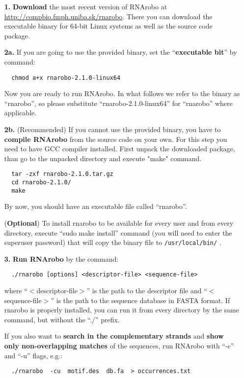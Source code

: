 \documentclass[11pt]{article}
\begin{document}
\begin{enumerate}
\item[\textbf{1.}] \textbf{Download} the most recent version of RNArobo at \url{http://compbio.fmph.uniba.sk/rnarobo}. There you can download the executable binary for 64-bit Linux systems as well as the source code package. 

\item[\textbf{2a.}] If you are going to use the provided binary, set the ``\textbf{executable bit}'' by command:
\begin{verbatim}
  chmod a+x rnarobo-2.1.0-linux64
\end{verbatim}
Now you are ready to run RNArobo. In what follows we refer to the binary as ``rnarobo'', so please substitute ``rnarobo-2.1.0-linux64'' for ``rnarobo'' where applicable.

\item[\textbf{2b.}] (Recommended) If you cannot use the provided binary, you have to \textbf{compile RNArobo} from the source code on your own. For this step you need to have GCC compiler installed. First unpack the downloaded package, than go to the unpacked directory and execute "make" command.
\begin{verbatim}
  tar -zxf rnarobo-2.1.0.tar.gz 
  cd rnarobo-2.1.0/
  make
\end{verbatim}

By now, you should have an executable file called ``rnarobo''. 

(\textbf{Optional}) To install rnarobo to be available for every user and from every directory, execute ``sudo make install'' command (you will need to enter the superuser password) that will copy the binary file to \texttt{/usr/local/bin/} .

\item[\textbf{3.}] \textbf{Run RNArobo} by the command:
\begin{verbatim}
  ./rnarobo [options] <descriptor-file> <sequence-file>
\end{verbatim}

where ``$<$descriptor-file$>$'' is the path to the descriptor file and ``$<$sequence-file$>$'' is the path to the sequence database in FASTA format. If rnarobo is properly installed, you can run it from every directory by the same command, but without the ``./'' prefix.

If you also want to \textbf{search in the complementary strands} and \textbf{show only non-overlapping matches} of the sequences, run RNArobo with ``-c'' and ``-u'' flags, e.g.: 
\begin{verbatim}
  ./rnarobo  -cu  motif.des  db.fa  > occurrences.txt
\end{verbatim}
\end{enumerate}
\end{document}
